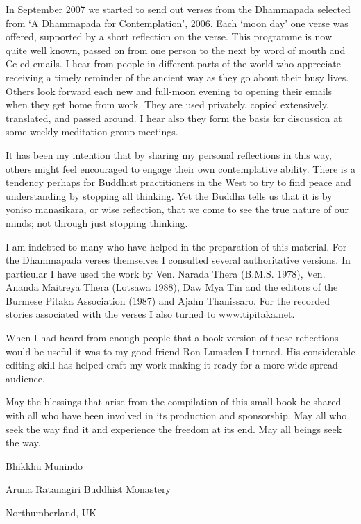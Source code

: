 \documentclass[a4paper,portrait,12pt]{article}
\begin{document}
In September 2007 we started to send out verses from the Dhammapada selected from `A Dhammapada for Contemplation', 2006. Each `moon day' one verse was offered, supported by a short reflection on the verse. This programme is now quite well known, passed on from one person to the next by word of mouth and Cc-ed emails. I hear from people in different parts of the world who appreciate receiving a timely reminder of the ancient way as they go about their busy lives. Others look forward each new and full-moon evening to opening their emails when they get home from work. They are used privately, copied extensively, translated, and passed around. I hear also they form the basis for discussion at some weekly meditation group meetings.


	It has been my intention that by sharing my personal reflections in this way, others might feel encouraged to engage their own contemplative ability. There is a tendency perhaps for Buddhist practitioners in the West to try to find peace and understanding by stopping all thinking. Yet the Buddha tells us that it is by yoniso manasikara, or wise reflection, that we come to see the true nature of our minds; not through just stopping thinking.


	I am indebted to many who have helped in the preparation of this material. For the Dhammapada verses themselves I consulted several authoritative versions. In particular I have used the work by Ven. Narada Thera (B.M.S. 1978), Ven. Ananda Maitreya Thera (Lotsawa 1988), Daw Mya Tin and the editors of the Burmese Pitaka Association (1987) and Ajahn Thanissaro. For the recorded stories associated with the verses I also turned to \href{http://www.tipitaka.net/}{www.tipitaka.net}. 


When I had heard from enough people that a book version of these reflections would be useful it was to my good friend Ron Lumsden I turned. His considerable editing skill has helped craft my work making it ready for a more wide-spread audience.


	May the blessings that arise from the compilation of this small book be shared with all who have been involved in its production and sponsorship.  May all who seek the way find it and experience the freedom at its end. May all beings seek the way.





Bhikkhu Munindo


Aruna Ratanagiri Buddhist Monastery


Northumberland, UK
\end{document}
